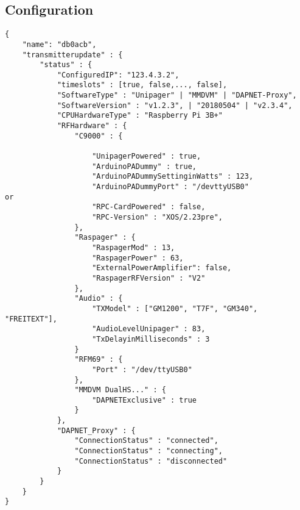 \documentclass[a4paper]{article}
\begin{document}
\subsection{Configuration}
\begin{lstlisting}
{
    "name": "db0acb",
	"transmitterupdate" : {
		"status" : {
			"ConfiguredIP": "123.4.3.2",
            "timeslots" : [true, false,...,	false],
			"SoftwareType" : "Unipager" | "MMDVM" | "DAPNET-Proxy",
            "SoftwareVersion" : "v1.2.3", | "20180504" | "v2.3.4",
			"CPUHardwareType" : "Raspberry Pi 3B+"
			"RFHardware" : {
				"C9000" : {

					"UnipagerPowered" : true,
					"ArduinoPADummy" : true,
					"ArduinoPADummySettinginWatts" : 123,
					"ArduinoPADummyPort" : "/devttyUSB0"
or
					"RPC-CardPowered" : false,
					"RPC-Version" : "XOS/2.23pre",
                },
                "Raspager" : {
                    "RaspagerMod" : 13,
                    "RaspagerPower" : 63,
                    "ExternalPowerAmplifier": false,
                    "RaspagerRFVersion" : "V2"
                },
                "Audio" : {
                    "TXModel" : ["GM1200", "T7F", "GM340", "FREITEXT"],
                    "AudioLevelUnipager" : 83,
                    "TxDelayinMilliseconds" : 3
                }
                "RFM69" : {
                	"Port" : "/dev/ttyUSB0"
                },
                "MMDVM DualHS..." : {
                    "DAPNETExclusive" : true
                }
            },
            "DAPNET_Proxy" : {
                "ConnectionStatus" : "connected",
                "ConnectionStatus" : "connecting",
                "ConnectionStatus" : "disconnected"
            }
        }
    }
}
\end{lstlisting}
\end{document}
